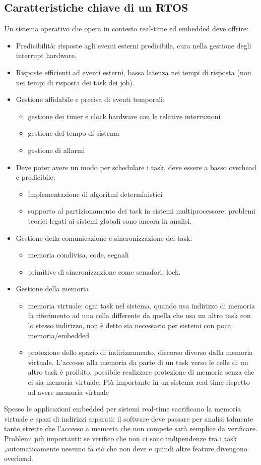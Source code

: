 \documentclass[12pt, oneside]{extbook}
\begin{document}
\subsection{Caratteristiche chiave di un RTOS}
Un sistema operativo che opera in contesto real-time ed embedded deve offrire:
\begin{itemize}
\item Predicibilità: risposte agli eventi esterni predicibile, cura nella gestione degli interrupt hardware.
\item Risposte efficienti ad eventi esterni, bassa latenza nei tempi di risposta (non nei tempi di risposta dei task dei job).
\item Gestione affidabile e precisa di eventi temporali:
\begin{itemize}
\item gestione dei timer e clock hardware con le relative interruzioni
\item gestione del tempo di sistema 
\item gestione di allarmi
\end{itemize}
\item Deve poter avere un modo per schedulare i task, deve essere a basso overhead e predicibile:
\begin{itemize}
\item implementazione di algoritmi deterministici
\item supporto al partizionamento dei task in sistemi multiprocessore: problemi teorici legati ai sistemi globali sono ancora in analisi.
\end{itemize}
\item Gestione della comunicazione e sincronizzazione dei task:
\begin{itemize}
\item memoria condivisa, code, segnali
\item primitive di sincronizzazione come semafori, lock.
\end{itemize}
\item Gestione della memoria
\begin{itemize}
\item memoria virtuale: ogni task nel sistema, quando usa indirizzo di memoria fa riferimento ad una cella differente da quella che usa un altro task con lo stesso indirizzo, non è detto sia necessario per sistemi con poca memoria/embedded
\item protezione dello spazio di indirizzamento, discorso diverso dalla memoria virtuale. L'accesso alla memoria da parte di un task verso le celle di un altro task è proibito, possibile realizzare protezione di memoria senza che ci sia memoria virtuale. Più importante in un sistema real-time rispetto ad avere memoria virtuale
\end{itemize}
\end{itemize}
Spesso le applicazioni embedded per sistemi real-time sacrificano la memoria virtuale e spazi di indirizzi separati: il software deve passare per analisi talmente tanto strette che l'accesso a memoria che non compete sarà semplice da verificare. Problemi più importanti: se verifico che non ci sono indipendenze tra i task ,automaticamente nessuno fa ciò che non deve e quindi altre feature divengono overhead.
\end{document}
